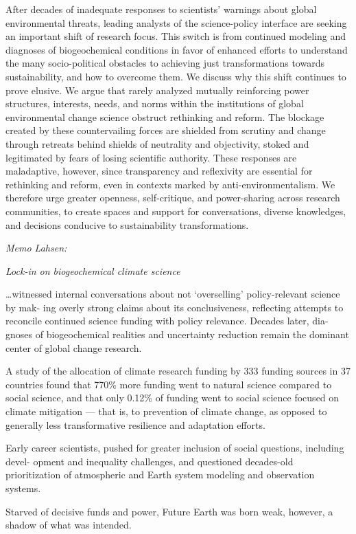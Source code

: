 \documentclass[
]{book}
\begin{document}
After decades of inadequate responses to scientists' warnings about global environmental threats,
leading analysts of the science-policy interface are seeking an important shift of research focus.
This switch is from continued modeling and diagnoses of biogeochemical conditions in
favor of enhanced efforts to understand the many socio-political obstacles to achieving just
transformations towards sustainability, and how to overcome them. We discuss why this shift
continues to prove elusive. We argue that rarely analyzed mutually reinforcing power structures,
interests, needs, and norms within the institutions of global environmental change science obstruct
rethinking and reform. The blockage created by these countervailing forces are shielded from
scrutiny and change through retreats behind shields of neutrality and objectivity, stoked and
legitimated by fears of losing scientific authority. These responses are maladaptive, however, since
transparency and reflexivity are essential for rethinking and reform, even in contexts marked by
anti-environmentalism. We therefore urge greater openness, self-critique, and power-sharing
across research communities, to create spaces and support for conversations, diverse knowledges,
and decisions conducive to sustainability transformations.

\emph{Memo Lahsen:}

\emph{Lock-in on biogeochemical climate science}

\ldots witnessed internal conversations about
not `overselling' policy-relevant science by mak-
ing overly strong claims about its conclusiveness,
reflecting attempts to reconcile continued science
funding with policy relevance. Decades later, dia-
gnoses of biogeochemical realities and uncertainty
reduction remain the dominant center of global
change research.

A study of the allocation of climate research funding by 333 funding sources in 37
countries found that 770\% more funding went to natural science compared to social science,
and that only 0.12\% of funding went to social science focused on
climate mitigation --- that is,
to prevention of climate change, as opposed to
generally less transformative resilience and adaptation efforts.

Early career scientists, pushed for
greater inclusion of social questions, including devel-
opment and inequality challenges, and questioned
decades-old prioritization of atmospheric and Earth
system modeling and observation systems.

Starved of decisive funds
and power, Future Earth was born weak, however,
a shadow of what was intended.
\end{document}

